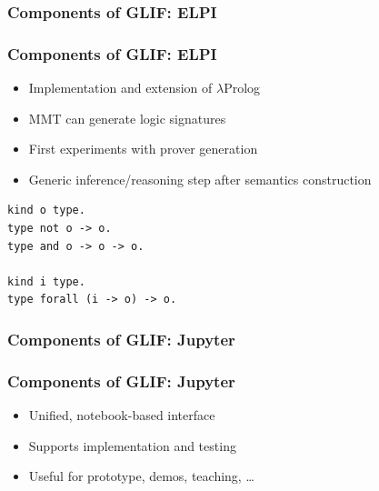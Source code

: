 \begin{frame}
    \frametitle{Components of GLIF: ELPI}
    
\end{frame}

\begin{frame}[fragile]
    \frametitle{Components of GLIF: ELPI}
    \begin{itemize}
        \item Implementation and extension of $\lambda$Prolog
        \item MMT can generate logic signatures
        \item First experiments with prover generation
        \item Generic inference/reasoning step after semantics construction
    \end{itemize}
    \lstset{basicstyle=\footnotesize\ttfamily}

    \vspace{1em}
    \begin{minipage}[t]{\textwidth}
        \centering
        \begin{minipage}[t]{0.5\textwidth}
            \begin{lstlisting}[language=ELPI,frame=single]
kind o type.
type not o -> o.
type and o -> o -> o.

kind i type.
type forall (i -> o) -> o.
            \end{lstlisting}
        \end{minipage}
    \end{minipage}
\end{frame}

\begin{frame}
    \frametitle{Components of GLIF: Jupyter}
    
\end{frame}

\begin{frame}
    \frametitle{Components of GLIF: Jupyter}
    \begin{itemize}
        \item Unified, notebook-based interface
        \item Supports implementation and testing
        \item Useful for prototype, demos, teaching, \dots
    \end{itemize}

    \centering
    \vspace{1.5em}
\end{frame}
